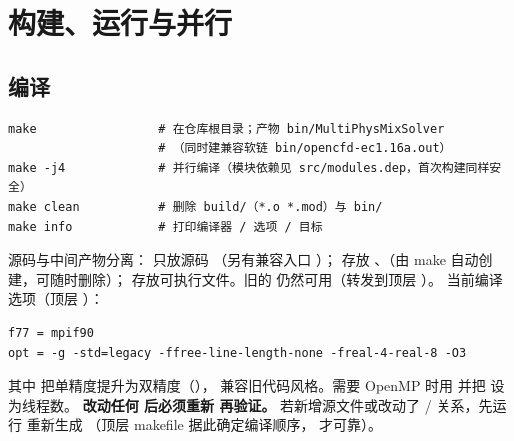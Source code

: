 \section{构建、运行与并行}
\label{sec:build}

\subsection{编译}
\begin{lstlisting}
make                 # 在仓库根目录；产物 bin/MultiPhysMixSolver
                     # （同时建兼容软链 bin/opencfd-ec1.16a.out）
make -j4             # 并行编译（模块依赖见 src/modules.dep，首次构建同样安全）
make clean           # 删除 build/（*.o *.mod）与 bin/
make info            # 打印编译器 / 选项 / 目标
\end{lstlisting}
源码与中间产物分离： 只放源码 （另有兼容入口 ）；
 存放 、（由 make 自动创建，可随时删除）；
 存放可执行文件。旧的  仍然可用（转发到顶层 ）。
当前编译选项（顶层 ）：
\begin{lstlisting}
f77 = mpif90
opt = -g -std=legacy -ffree-line-length-none -freal-4-real-8 -O3
\end{lstlisting}
其中  把单精度提升为双精度（），
 兼容旧代码风格。需要 OpenMP 时用  并把  设为线程数。
\textbf{改动任何  后必须重新  再验证。}
若新增源文件或改动了 / 关系，先运行
 重新生成 
（顶层 makefile 据此确定编译顺序， 才可靠）。

